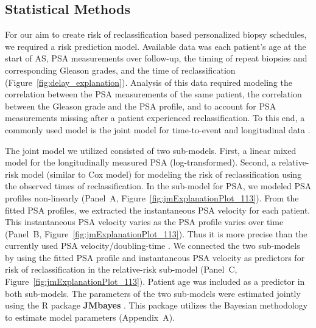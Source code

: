 \subsection{Statistical Methods}
For our aim to create risk of reclassification based personalized biopsy schedules, we required a risk prediction model. Available data was each patient's age at the start of AS, PSA measurements over follow-up, the timing of repeat biopsies and corresponding Gleason grades, and the time of reclassification (Figure~\ref{fig:delay_explanation}). Analysis of this data required modeling the correlation between the PSA measurements of the same patient, the correlation between the Gleason grade and the PSA profile, and to account for PSA measurements missing after a patient experienced reclassification. To this end, a commonly used model is the joint model for time-to-event and longitudinal data \citep{tomer2019,coley2017prediction,rizopoulos2012joint}.


The joint model we utilized consisted of two sub-models. First, a linear mixed model \citep{laird1982random} for the longitudinally measured PSA (log-transformed). Second, a relative-risk model (similar to Cox model) for modeling the risk of reclassification using the observed times of reclassification. In the sub-model for PSA, we modeled PSA profiles non-linearly (Panel~A, Figure~\ref{fig:jmExplanationPlot_113}). From the fitted PSA profiles, we extracted the instantaneous PSA velocity for each patient. This instantaneous PSA velocity varies as the PSA profile varies over time (Panel~B, Figure~\ref{fig:jmExplanationPlot_113}). Thus it is more precise than the currently used PSA velocity/doubling-time \citep{vickers2009psavelocity}. We connected the two sub-models by using the fitted PSA profile and instantaneous PSA velocity as predictors for risk of reclassification in the relative-risk sub-model (Panel~C, Figure~\ref{fig:jmExplanationPlot_113}). Patient age was included as a predictor in both sub-models. The parameters of the two sub-models were estimated jointly using the R package \textbf{JMbayes} \citep{rizopoulosJMbayes}. This package utilizes the Bayesian methodology to estimate model parameters (Appendix~A). 


